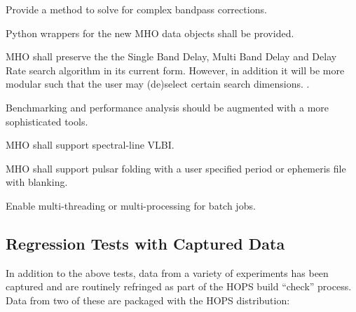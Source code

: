 \begin{description}
 Provide a method to solve for complex bandpass corrections.

 Python wrappers for the new \acs{MHO} data objects shall be
    provided.


 \ac{MHO} shall preserve the the Single Band Delay,
    Multi Band Delay and Delay Rate search algorithm in its current form.
    However, in addition it will be more modular such that the user may
    (de)select certain search dimensions.
.


 Benchmarking and performance analysis should be augmented
    with a more sophisticated tools.

 \ac{MHO} shall support spectral-line VLBI.

 \ac{MHO} shall support pulsar folding with a user
    specified period or ephemeris file with blanking.

 Enable multi-threading or multi-processing for batch jobs.


\end{description}




\subsection{Regression Tests with Captured Data}
\label{sec:captdatareq}

In addition to the above tests, data from a variety of experiments
has been captured and are routinely refringed as part of the
\ac{HOPS} build ``check'' process.  Data from two of
these are packaged with the \ac{HOPS} distribution:


